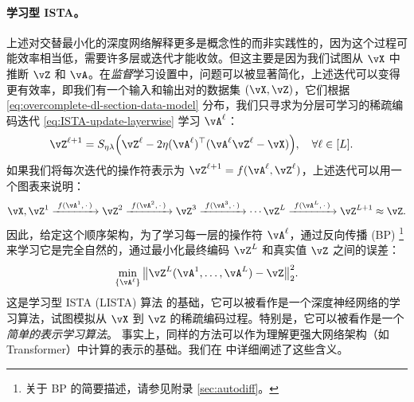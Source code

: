 \documentclass[../../book-main.tex]{subfiles}
\begin{document}
\paragraph{学习型 ISTA。} 上述对交替最小化的深度网络解释更多是概念性的而非实践性的，因为这个过程可能效率相当低，需要许多层或迭代才能收敛。但这主要是因为我们试图从 \(\vX\) 中推断 \(\vZ\) 和 \(\vA\)。在\textit{监督}学习设置中，问题可以被显著简化，上述迭代可以变得更有效率，即我们有一个输入和输出对的数据集 \((\vX, \vZ)\)，它们根据 \eqref{eq:overcomplete-dl-section-data-model} 分布，我们只寻求为分层可学习的稀疏编码迭代 \eqref{eq:ISTA-update-layerwise} 学习 \(\vA^\ell\)：
\begin{align}
    & \vZ^{\ell + 1} = S_{\eta\lambda}\rp{\vZ^{\ell} - 2\eta(\vA^{\ell})^{\top}(\vA^\ell\vZ^{\ell} - \vX)}, \quad \forall \ell \in [L].
\end{align}
如果我们将每次迭代的操作符表示为 $\vZ^{\ell + 1} = f(\vA^\ell, \vZ^\ell)$，上述迭代可以用一个图表来说明：
\begin{equation*}
\vX, \vZ^1 \xrightarrow{\hspace{1mm} f(\vA^1,\,\cdot\,) \hspace{1mm}}  \vZ^2 \xrightarrow{\hspace{1mm} f(\vA^2,\,\cdot\,) \hspace{1mm}}  \vZ^3  \xrightarrow{\hspace{1mm} f(\vA^3,\,\cdot\,) \hspace{1mm}} \cdots \vZ^{L}  \xrightarrow{\hspace{1mm} f(\vA^{L},\,\cdot\,) \hspace{1mm}} \vZ^{L + 1} \approx \vZ.  
\label{eqn:deep-sparse-encoding}
\end{equation*}
因此，给定这个顺序架构，为了学习每一层的操作符 \(\vA^\ell\)，通过反向传播 (BP) \footnote{关于 BP 的简要描述，请参见附录 \ref{sec:autodiff}。} 来学习它是完全自然的，通过最小化最终编码 $\vZ^L$ 和真实值 $\vZ$ 之间的误差：
\begin{equation}\label{eq:lista-training}
    \min_{\{\vA^\ell\}} \big\|\vZ^L(\vA^1, \ldots, \vA^{L}) - \vZ\big\|_2^2.
\end{equation}
这是学习型 ISTA (LISTA) 算法 \cite{gregor2010learning} 的基础，它可以被看作是一个深度神经网络的学习算法，试图模拟从 $\vX$ 到 $\vZ$ 的稀疏编码过程。特别是，它可以被看作是一个\textit{简单的表示学习算法}。
事实上，同样的方法可以作为理解更强大网络架构（如 Transformer）中计算的表示的基础。我们在  中详细阐述了这些含义。
\end{document}
